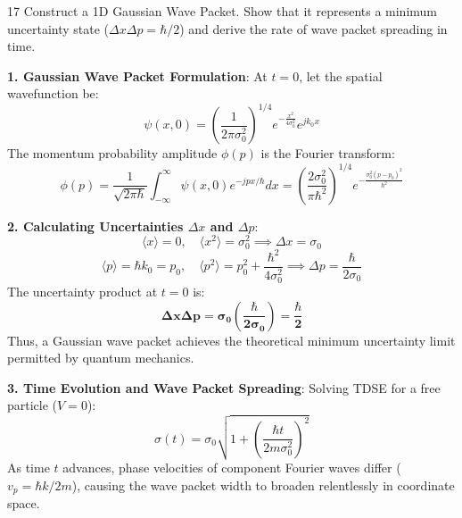 \begin{theoryq}{17}
Construct a 1D Gaussian Wave Packet. Show that it represents a minimum uncertainty state ($\Delta x \Delta p = \hbar/2$) and derive the rate of wave packet spreading in time.
\end{theoryq}
\begin{theorysol}
\textbf{1. Gaussian Wave Packet Formulation}:
At $t=0$, let the spatial wavefunction be:
\begin{equation}
\psi(x,0) = \left(\frac{1}{2\pi \sigma_0^2}\right)^{1/4} e^{-\frac{x^2}{4\sigma_0^2}} e^{j k_0 x}
\end{equation}
The momentum probability amplitude $\phi(p)$ is the Fourier transform:
\begin{equation}
\phi(p) = \frac{1}{\sqrt{2\pi\hbar}}\int_{-\infty}^\infty \psi(x,0) e^{-j px/\hbar} dx = \left(\frac{2\sigma_0^2}{\pi\hbar^2}\right)^{1/4} e^{-\frac{\sigma_0^2 (p - p_0)^2}{\hbar^2}}
\end{equation}

\textbf{2. Calculating Uncertainties $\Delta x$ and $\Delta p$}:
\begin{equation}
\langle x \rangle = 0,\quad \langle x^2 \rangle = \sigma_0^2 \implies \Delta x = \sigma_0
\end{equation}
\begin{equation}
\langle p \rangle = \hbar k_0 = p_0,\quad \langle p^2 \rangle = p_0^2 + \frac{\hbar^2}{4\sigma_0^2} \implies \Delta p = \frac{\hbar}{2\sigma_0}
\end{equation}
The uncertainty product at $t=0$ is:
\begin{equation}
\mathbf{\Delta x \Delta p = \sigma_0 \left(\frac{\hbar}{2\sigma_0}\right) = \frac{\hbar}{2}}
\end{equation}
Thus, a Gaussian wave packet achieves the theoretical minimum uncertainty limit permitted by quantum mechanics.

\textbf{3. Time Evolution and Wave Packet Spreading}:
Solving TDSE for a free particle ($V=0$):
\begin{equation}
\sigma(t) = \sigma_0 \sqrt{1 + \left(\frac{\hbar t}{2m \sigma_0^2}\right)^2}
\end{equation}
As time $t$ advances, phase velocities of component Fourier waves differ ($v_p = \hbar k/2m$), causing the wave packet width to broaden relentlessly in coordinate space.
\end{theorysol}
\vspace{4mm}


